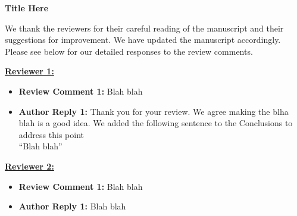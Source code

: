 \documentclass[onecolumn,prb,showpacs,aps,superscriptaddress]{revtex4-1}
\begin{document}
{\bf Title Here}


\vspace{1cm}

We thank the reviewers for their careful reading of the manuscript and their suggestions for improvement.  We have updated the manuscript accordingly.  Please see below for our detailed responses to the review comments.

\vspace{2cm}


\textbf{\underline{Reviewer 1:}}
\begin{itemize}
    \item  \textbf{Review Comment 1:} Blah blah
    \item  \textbf{Author Reply 1:} Thank you for your review. We agree making the blha blah is a good idea. We added the following sentence to the Conclusions to address this point \\
    ``Blah blah''
    
\end{itemize}

\textbf{\underline{Reviewer 2:}}
\begin{itemize}
    \item  \textbf{Review Comment 1:} Blah blah
    \item  \textbf{Author Reply 1:} Blah blah \\
     
\end{itemize}
\end{document}
